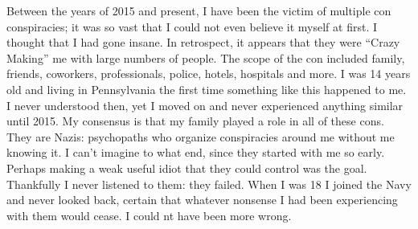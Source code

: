 \documentclass{article}
\date{\today}
\begin{document}
\maketitle

\begin{multicols}{2}


\begin{window} 
\end{window}

Between the years of 2015 and present, I have been the victim of multiple con conspiracies; it was so vast that I could not even believe it myself at first. I thought that I had gone insane. In retrospect, it appears that they were “Crazy Making” me with large numbers of people. The scope of the con included family, friends, coworkers, professionals, police, hotels, hospitals and more. I was 14 years old and living in Pennsylvania the first time something like this happened to me. I never understood then, yet I moved on and never experienced anything similar until 2015. My consensus is that my family played a role in all of these cons. They are Nazis: psychopaths who organize conspiracies around me without me knowing it. I can’t imagine to what end, since they started with me so early. Perhaps making a weak useful idiot that they could control was the goal. Thankfully I never listened to them: they failed. When I was 18 I joined the Navy and never looked back, certain that whatever nonsense I had been experiencing with them would cease. I could nt have been more wrong.

\end{multicols}

\closearticle
\end{document}
